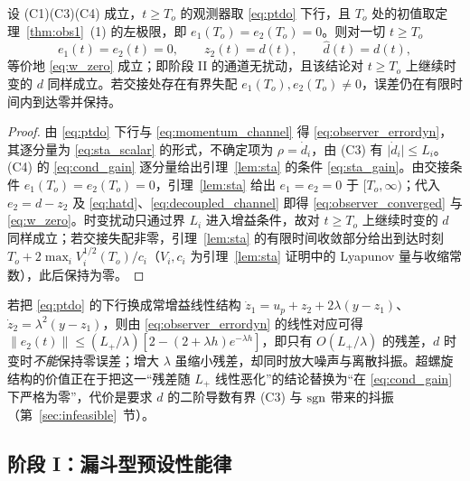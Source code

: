 \begin{theorem}[阶段 II：超螺旋滑模观测器]\label{thm:obs2}%
\label{thm:sta}
设 \textup{(C1)(C3)(C4)} 成立，\(t\ge T_o\) 的观测器取 \eqref{eq:ptdo} 下行，且 \(T_o\) 处的初值取定理~\ref{thm:obs1}~(1) 的左极限，即 \(e_1(T_o)=e_2(T_o)=0\)。则对一切 \(t\ge T_o\)
\begin{equation}
e_1(t)=e_2(t)=0,\qquad z_2(t)=d(t),\qquad \hat d(t)=d(t),
\label{eq:observer_converged}
\end{equation}
等价地 \eqref{eq:w_zero} 成立；即阶段 II 的通道无扰动，且该结论对 \(t\ge T_o\) 上继续时变的 \(d\) 同样成立。若交接处存在有界失配 \(e_1(T_o),e_2(T_o)\neq0\)，误差仍在有限时间内到达零并保持。
\end{theorem}

\begin{proof}
由 \eqref{eq:ptdo} 下行与 \eqref{eq:momentum_channel} 得 \eqref{eq:observer_errordyn}，其逐分量为 \eqref{eq:sta_scalar} 的形式，不确定项为 \(\rho=\dot d_i\)，由 \textup{(C3)} 有 \(\lvert\dot d_i\rvert\le L_i\)。\textup{(C4)} 的 \eqref{eq:cond_gain} 逐分量给出引理~\ref{lem:sta} 的条件 \eqref{eq:sta_gain}。由交接条件 \(e_1(T_o)=e_2(T_o)=0\)，引理~\ref{lem:sta} 给出 \(e_1=e_2=0\) 于 \([T_o,\infty)\)；代入 \(e_2=d-z_2\) 及 \eqref{eq:hatd}、\eqref{eq:decoupled_channel} 即得 \eqref{eq:observer_converged} 与 \eqref{eq:w_zero}。时变扰动只通过界 \(L_i\) 进入增益条件，故对 \(t\ge T_o\) 上继续时变的 \(d\) 同样成立；若交接失配非零，引理~\ref{lem:sta} 的有限时间收敛部分给出到达时刻 \(T_o+2\max_iV_i^{1/2}(T_o)/c_i\)（\(V_i,c_i\) 为引理~\ref{lem:sta} 证明中的 Lyapunov 量与收缩常数），此后保持为零。
\end{proof}

\begin{remark}\label{rem:sta_vs_linear}
若把 \eqref{eq:ptdo} 的下行换成常增益线性结构 \(\dot z_1=u_p+z_2+2\lambda(y-z_1)\)、\(\dot z_2=\lambda^{2}(y-z_1)\)，则由 \eqref{eq:observer_errordyn} 的线性对应可得 \(\|e_2(t)\|\le (L_+/\lambda)[2-(2+\lambda h)e^{-\lambda h}]\)，即只有 \(O(L_+/\lambda)\) 的残差，\(d\) 时变时\emph{不能}保持零误差；增大 \(\lambda\) 虽缩小残差，却同时放大噪声与离散抖振。超螺旋结构的价值正在于把这一“残差随 \(L_+\) 线性恶化”的结论替换为“在 \eqref{eq:cond_gain} 下严格为零”，代价是要求 \(d\) 的二阶导数有界 \textup{(C3)} 与 \(\operatorname{sgn}\) 带来的抖振（第~\ref{sec:infeasible}~节）。
\end{remark}

\subsection{阶段 I：漏斗型预设性能律}
\label{sec:ppc}

